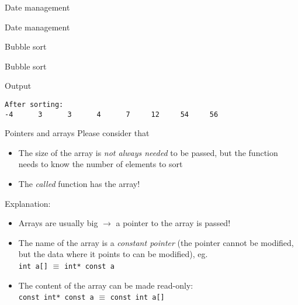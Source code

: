 \documentclass[usenames,dvipsnames,aspectratio=169]{beamer}
\begin{document}
\begin{frame}{Date management}
  \begin{exampleblock}{}
    \footnotesize
    
  \end{exampleblock}
\end{frame}

\begin{frame}{Date management}
  \begin{exampleblock}{}
    \footnotesize
    
  \end{exampleblock}
\end{frame}

\begin{frame}{Bubble sort}
  \begin{exampleblock}{}
    \small
    
  \end{exampleblock}
\end{frame}

\begin{frame}[fragile]{Bubble sort}
  \begin{exampleblock}{}
    \footnotesize
    
  \end{exampleblock}
  \begin{block}{Output}
    \footnotesize
    \begin{verbatim}
After sorting:
-4      3      3      4      7     12     54     56
\end{verbatim}
  \end{block}
\end{frame}

\begin{frame}{Pointers and arrays}
  Please consider that
  \begin{itemize}
    \item The size of the array is \emph{not always needed} to be passed, but the function needs to know the number of elements to sort
    \item The \emph{called} function has  the array!
  \end{itemize}
  Explanation:
  \begin{itemize}
    \item Arrays are usually big $\to$  a pointer to the array is passed!
    \item The name of the array is a \emph{constant pointer} (the pointer cannot be modified, but the data where it points to can be modified),
eg.\\ \texttt{int a[]} $\equiv$ \texttt{int* const a}
    \item The content of the array can be made read-only: \\ \texttt{const int* const a} $\equiv$ \texttt{const int a[]}
  \end{itemize}
\end{frame}
\end{document}
